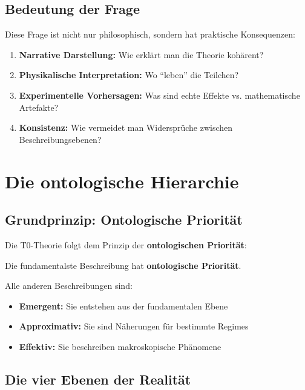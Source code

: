 	\subsection{Bedeutung der Frage}
	
	Diese Frage ist nicht nur philosophisch, sondern hat praktische Konsequenzen:
	
	\begin{enumerate}
		\item \textbf{Narrative Darstellung:} Wie erklärt man die Theorie kohärent?
		\item \textbf{Physikalische Interpretation:} Wo \enquote{leben} die Teilchen?
		\item \textbf{Experimentelle Vorhersagen:} Was sind echte Effekte vs. mathematische Artefakte?
		\item \textbf{Konsistenz:} Wie vermeidet man Widersprüche zwischen Beschreibungsebenen?
	\end{enumerate}
	
	\section{Die ontologische Hierarchie}
	
	\subsection{Grundprinzip: Ontologische Priorität}
	
	Die T0-Theorie folgt dem Prinzip der \textbf{ontologischen Priorität}:
	
	\begin{keyresult}
		Die fundamentalste Beschreibung hat \textbf{ontologische Priorität}.
		
		Alle anderen Beschreibungen sind:
		\begin{itemize}
			\item \textbf{Emergent:} Sie entstehen aus der fundamentalen Ebene
			\item \textbf{Approximativ:} Sie sind Näherungen für bestimmte Regimes
			\item \textbf{Effektiv:} Sie beschreiben makroskopische Phänomene
		\end{itemize}
	\end{keyresult}
	
	\subsection{Die vier Ebenen der Realität}
	

